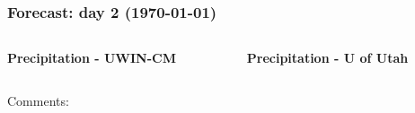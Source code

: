 \documentclass[aspectratio=169, 10pt]{beamer}
\begin{document}
\begin{frame}
\frametitle{Forecast: day 2 ({\AdvanceDate[+2]\today})}

\vspace{-.3cm}
\begin{columns}
\begin{column}{0.5\textwidth}
\begin{center}
\textbf{Precipitation - UWIN-CM}\\
\end{center}
\end{column}

\begin{column}{0.5\textwidth}
\begin{center}
\textbf{Precipitation - U of Utah} \\
\end{center}
\end{column}
\end{columns}

\begin{figure}


\end{figure}

Comments:
\vspace{4cm}


\end{frame}
\end{document}

